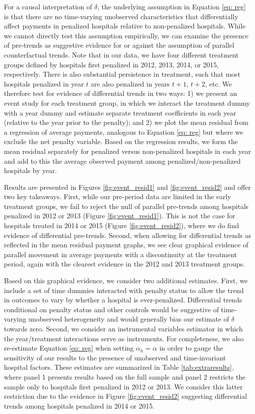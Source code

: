 \documentclass[12pt]{article}
\begin{document}
For a causal interpretation of $\delta$, the underlying assumption in Equation \ref{eq: reg} is that there are no time-varying unobserved characteristics that differentially affect payments in penalized hospitals relative to non-penalized hospitals. While we cannot directly test this assumption empirically, we can examine the presence of pre-trends as suggestive evidence for or against the assumption of parallel counterfactual trends. Note that in our data, we have four different treatment groups defined by hospitals first penalized in 2012, 2013, 2014, or 2015, respectively. There is also substantial persistence in treatment, such that most hospitals penalized in year $t$ are also penalized in years $t+1$, $t+2$, etc. We therefore test for evidence of differential trends in two ways: 1) we present an event study for each treatment group, in which we interact the treatment dummy with a year dummy and estimate separate treatment coefficients in each year (relative to the year prior to the penalty); and 2) we plot the mean residual from a regression of average payments, analogous to Equation \ref{eq: reg} but where we exclude the net penalty variable. Based on the regression results, we form the mean residual separately for penalized versus non-penalized hospitals in each year and add to this the average observed payment among penalized/non-penalized hospitals by year.

Results are presented in Figures \ref{fig:event_resid1} and \ref{fig:event_resid2} and offer two key takeaways. First, while our pre-period data are limited in the early treatment groups, we fail to reject the null of parallel pre-trends among hospitals penalized in 2012 or 2013 (Figure \ref{fig:event_resid1}). This is not the case for hospitals treated in 2014 or 2015 (Figure \ref{fig:event_resid2}), where we do find evidence of differential pre-trends. Second, when allowing for differential trends as reflected in the mean residual payment graphs, we see clear graphical evidence of parallel movement in average payments with a discontinuity at the treatment period, again with the clearest evidence in the 2012 and 2013 treatment groups.

Based on this graphical evidence, we consider two additional estimates. First, we include a set of time dummies interacted with penalty status to allow the trend in outcomes to vary by whether a hospital is ever-penalized. Differential trends conditional on penalty status and other controls would be suggestive of time-varying unobserved heterogeneity and would generally bias our estimate of $\delta$ towards zero. Second, we consider an instrumental variables estimator in which the year/treatment interactions serve as instruments. For completeness, we also re-estimate Equation \ref{eq: reg} when setting $\alpha_{h}=\alpha$ in order to gauge the sensitivity of our results to the presence of unobserved and time-invariant hospital factors. These estimates are summarized in Table \ref{tab:extraresults}, where panel 1 presents results based on the full sample and panel 2 restricts the sample only to hospitals first penalized in 2012 or 2013. We consider this latter restriction due to the evidence in Figure \ref{fig:event_resid2} suggesting differential trends among hospitals penalized in 2014 or 2015.
\end{document}
